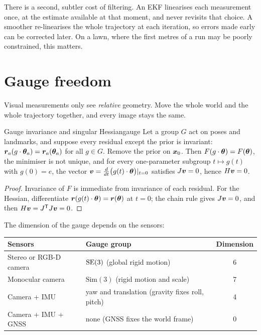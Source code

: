 There is a second, subtler cost of filtering. An EKF linearises each
measurement once, at the estimate available at that moment, and never
revisits that choice. A smoother re-linearises the whole trajectory at
each iteration, so errors made early can be corrected later. On a lawn,
where the first metres of a run may be poorly constrained, this matters.

\section{Gauge freedom}

Visual measurements only see \emph{relative} geometry. Move the whole
world and the whole trajectory together, and every image stays the same.

\begin{proposition}{Gauge invariance and singular Hessian}{gauge}
Let a group $G$ act on poses and landmarks, and suppose every residual
except the prior is invariant: $\bm{r}_a(g\cdot\bm{\theta}_a)=
\bm{r}_a(\bm{\theta}_a)$ for all $g\in G$. Remove the prior on $\bm{x}_0$. Then
$F(g\cdot\bm{\theta})=F(\bm{\theta})$, the minimiser is not unique, and for every
one-parameter subgroup $t\mapsto g(t)$ with $g(0)=e$, the vector
$\bm{v}=\tfrac{d}{dt}\bigl(g(t)\cdot\bm{\theta}\bigr)|_{t=0}$ satisfies
$J\bm{v}=0$, hence $H\bm{v}=0$.
\end{proposition}

\begin{proof}
Invariance of $F$ is immediate from invariance of each residual. For the
Hessian, differentiate $\bm{r}(g(t)\cdot\bm{\theta})=\bm{r}(\bm{\theta})$ at
$t=0$; the chain rule gives $J\bm{v}=0$, and then
$H\bm{v}=J^{\mathsf{T}} J\bm{v}=0$.
\end{proof}

The dimension of the gauge depends on the sensors:

\begin{center}
\begin{tabular}{@{}llc@{}}
\toprule
Sensors & Gauge group & Dimension\\
\midrule
Stereo or RGB-D camera & $\mathrm{SE}(3)$ (global rigid motion) & 6\\
Monocular camera & $\mathrm{Sim}(3)$ (rigid motion and scale) & 7\\
Camera + IMU & yaw and translation (gravity fixes roll, pitch) & 4\\
Camera + IMU + GNSS & none (GNSS fixes the world frame) & 0\\
\bottomrule
\end{tabular}
\end{center}

